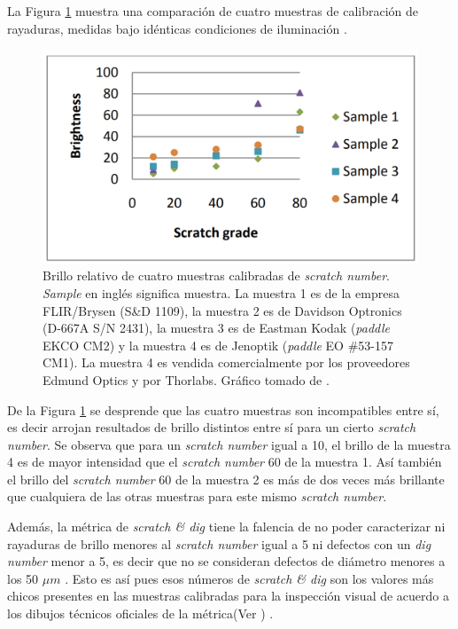 La Figura \ref{fig:samplescratchs} muestra una comparación de cuatro muestras de calibración de rayaduras, medidas bajo idénticas condiciones de iluminación \cite{Aikens}.
\begin{figure}[H]
	\centering
	\includegraphics[scale=0.54]{Figs/cuantificaciondefectos/samplesscratch.png}
	\caption{Brillo relativo de cuatro muestras calibradas de \textit{scratch number}. \textit{Sample} en inglés significa muestra. La muestra 1 es de la empresa FLIR/Brysen (S\&D 1109), la muestra 2 es de Davidson Optronics (D-667A S/N 2431), la muestra 3 es de Eastman Kodak (\textit{paddle} EKCO CM2) y la muestra 4 es de Jenoptik (\textit{paddle} EO \#53-157 CM1). La muestra 4 es vendida comercialmente por los proveedores Edmund Optics y por Thorlabs. Gráfico tomado de \cite{Aikens}.}
	\label{fig:samplescratchs}
\end{figure}


De la Figura \ref{fig:samplescratchs} se desprende que las cuatro muestras son incompatibles entre sí, es decir arrojan resultados de brillo distintos entre sí para un cierto \textit{scratch number}. Se observa que para un \textit{scratch number} igual a 10, el brillo de la muestra 4 es de mayor intensidad que el \textit{scratch number} 60 de la muestra 1.
Así también el brillo del \textit{scratch number} 60 de la muestra 2 es más de dos veces más brillante que cualquiera de las otras muestras para este mismo \textit{scratch number}.

Además, la métrica de \textit{scratch \& dig} tiene la falencia de no poder caracterizar ni rayaduras de brillo menores al \textit{scratch number} igual a 5 ni defectos con un \textit{dig number} menor a 5, es decir que no se consideran defectos de diámetro menores a los 50 $\mu m$ \cite{quentin}. Esto es así pues esos números de \textit{scratch \& dig} son los valores más chicos presentes en las muestras calibradas para la inspección visual de acuerdo a los dibujos técnicos oficiales de la métrica(Ver \cite{dibujito})  .

